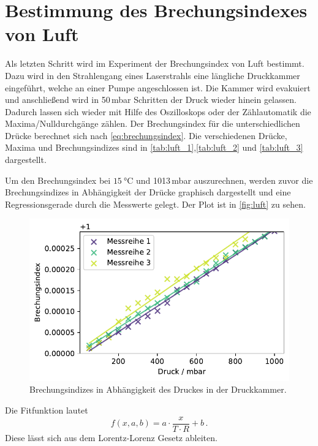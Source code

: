 \section{Bestimmung des Brechungsindexes von Luft}
Als letzten Schritt wird im Experiment der Brechungsindex von Luft bestimmt.
Dazu wird in den Strahlengang eines Laserstrahls eine längliche Druckkammer eingeführt, welche an einer
Pumpe angeschlossen ist. Die Kammer wird evakuiert und anschließend wird in 50\,mbar Schritten der Druck
wieder hinein gelassen.
Dadurch lassen sich wieder mit Hilfe des Oszilloskops oder der Zählautomatik die Maxima/Nulldurchgänge zählen.
Der Brechungsindex für die unterschiedlichen Drücke berechnet sich nach \autoref{eq:brechungsindex}.
Die verschiedenen Drücke, Maxima und Brechungsindizes sind in \autoref{tab:luft_1},\autoref{tab:luft_2} und \autoref{tab:luft_3}
dargestellt.



\FloatBarrier
Um den Brechungsindex bei $\SI{15}{\celsius}$ und 1013\,mbar auszurechnen, werden zuvor die Brechungsindizes
in Abhängigkeit der Drücke graphisch dargestellt und eine Regressionsgerade durch die Messwerte gelegt.
Der Plot ist in \autoref{fig:luft} zu sehen.
\begin{figure}
    \centering
    \includegraphics[width=0.8\linewidth]{Plots/Brechungsindex.pdf}
    \caption{Brechungsindizes in Abhängigkeit des Druckes in der Druckkammer.}
    \label{fig:luft}
\end{figure}
\FloatBarrier
Die Fitfunktion lautet 
\begin{equation}
    f(x, a, b) = a \cdot \frac{x}{T \cdot R} + b \, .
    \label{eqn:fit}
\end{equation}
Diese lässt sich aus dem Lorentz-Lorenz Gesetz ableiten.
